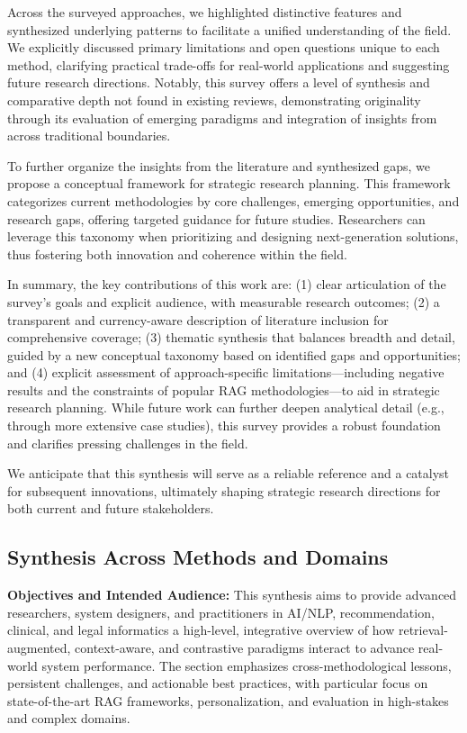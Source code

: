 \documentclass[sigconf]{acmart}
\begin{document}
Across the surveyed approaches, we highlighted distinctive features and synthesized underlying patterns to facilitate a unified understanding of the field. We explicitly discussed primary limitations and open questions unique to each method, clarifying practical trade-offs for real-world applications and suggesting future research directions. Notably, this survey offers a level of synthesis and comparative depth not found in existing reviews, demonstrating originality through its evaluation of emerging paradigms and integration of insights from across traditional boundaries.

To further organize the insights from the literature and synthesized gaps, we propose a conceptual framework for strategic research planning. This framework categorizes current methodologies by core challenges, emerging opportunities, and research gaps, offering targeted guidance for future studies. Researchers can leverage this taxonomy when prioritizing and designing next-generation solutions, thus fostering both innovation and coherence within the field.

In summary, the key contributions of this work are: (1) clear articulation of the survey's goals and explicit audience, with measurable research outcomes; (2) a transparent and currency-aware description of literature inclusion for comprehensive coverage; (3) thematic synthesis that balances breadth and detail, guided by a new conceptual taxonomy based on identified gaps and opportunities; and (4) explicit assessment of approach-specific limitations—including negative results and the constraints of popular RAG methodologies—to aid in strategic research planning. While future work can further deepen analytical detail (e.g., through more extensive case studies), this survey provides a robust foundation and clarifies pressing challenges in the field.

We anticipate that this synthesis will serve as a reliable reference and a catalyst for subsequent innovations, ultimately shaping strategic research directions for both current and future stakeholders.

\subsection{Synthesis Across Methods and Domains}

\textbf{Objectives and Intended Audience:} This synthesis aims to provide advanced researchers, system designers, and practitioners in AI/NLP, recommendation, clinical, and legal informatics a high-level, integrative overview of how retrieval-augmented, context-aware, and contrastive paradigms interact to advance real-world system performance. The section emphasizes cross-methodological lessons, persistent challenges, and actionable best practices, with particular focus on state-of-the-art RAG frameworks, personalization, and evaluation in high-stakes and complex domains.
\end{document}
